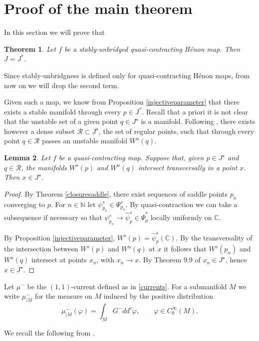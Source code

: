\documentclass[10pt,a4paper]{article}
\newtheorem{theorem}{Theorem}[section]
\newtheorem{lemma}[theorem]{Lemma}
\begin{document}
\section{Proof of the main theorem} \label{section:proof}

In this section we will prove that
\begin{theorem}
\label{maintheorem2}
Let $f$ be a stably-unbridged quasi-contracting H\'enon map. Then $J=J^*$.
\end{theorem}
Since stably-unbridgness is defined only for quasi-contracting H\'enon maps, from now on we will drop the second term.

Given such a map, we know from Proposition \ref{injectiveparameter} that there exists a stable manifold through every $p\in J^*$. Recall that a priori it is not clear that the unstable set of a given point $q \in J^\star$ is a manifold. Following \cite{BLS}, there exists however a dense subset $\mathcal R\subset J^\star$, the set of regular points, such that through every point $q\in\mathcal R$ passes an unstable manifold $W^u(q)$.

\begin{lemma}
\label{intersectionstableunstable}
Let $f$ be a quasi-contracting map. Suppose that, given $p\in J^\star$ and $q\in\mathcal R$, the manifolds $W^s(p)$ and $W^u(q)$ intersect transversally in a point $x$. Then $x\in J^\star$.
\end{lemma}
\begin{proof}
By Theorem \ref{closuresaddle}, there exist sequences of saddle points $p_n$ converging to $p$. For $n\in \mathbb N$ let $\psi_{p_n}^s\in \Psi_{p_n}^s$. By quasi-contraction we can take a subsequence if necessary so that $\psi_{p_n}^s\to\widehat\psi_p^s\in\widehat\Psi_p^s$ locally uniformly on $\mathbb C$.

By Proposition \ref{injectiveparameter}, $W^s(p)=\widehat\psi^s_p(\mathbb C)$. By the transversality of the intersection between $W^s(p)$ and $W^u(q)$ at $x$ it follows that $W^s(p_n)$ and $W^u(q)$ intersect at points $x_n$, with $x_n \rightarrow x$. By Theorem 9.9 of \cite{BLS} $x_n\in J^\star$, hence $x\in J^\star$.
\end{proof}

Let $\mu^-$ be the $(1,1)$-current defined as in \eqref{currents}. For a submanifold $M$ we write  $\mu^-_{|M}$ for the measure on $M$ induced by the positive distribution
\[
\mu^-_{|M}(\varphi)=\int_MG^-dd^c\varphi,\qquad \varphi\in C^\infty_0(M).
\]

We recall the following from \cite{BS2}.
\end{document}
